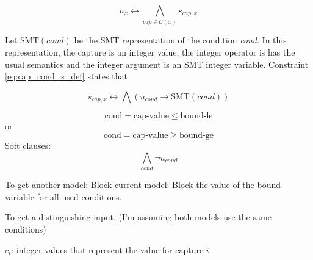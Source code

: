 \begin{equation}\label{eq:cap_cond_a_def}
    a_x \leftrightarrow \bigwedge_{cap \in \mathcal{C}(x)} s_{cap,x}
\end{equation}

Let \(\textrm{SMT}(\textit{cond})\) be the \ac{SMT} representation of the condition \textit{cond}. In this representation, the capture is an integer value, the integer operator is has the usual semantics and the integer argument is an SMT integer variable. Constraint \ref{eq:cap_cond_s_def} states that 

\begin{equation}\label{eq:cap_cond_s_def}
    s_{cap,x} \leftrightarrow \bigwedge (u_{cond} \rightarrow \textrm{SMT}(\textit{cond}))
\end{equation}

\begin{equation}
    \textrm{cond} = \textrm{cap-value} \leq \textrm{bound-le}
\end{equation}
or
\begin{equation}
    \textrm{cond} = \textrm{cap-value} \geq \textrm{bound-ge}
\end{equation}
Soft clauses:
\begin{equation}
    \bigwedge_{cond} \neg u_{cond}
\end{equation}

To get another model: Block current model: Block the value of the bound variable for all used conditions.

To get a distinguishing input.
(I'm assuming both models use the same conditions)

\(c_i\): integer values that represent the value for capture \(i\)

